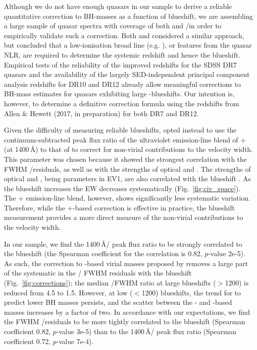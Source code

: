 Although we do not have enough quasars in our sample to derive a reliable quantitative correction to BH-masses as a function of  blueshift, we are assembling a large sample of quasar spectra with coverage of both  and \hbns/\ha in order to empirically validate such a correction. 
Both \citet{runnoe13} and \citet{shen12} considered a similar approach, but concluded that a low-ionisation broad line (e.g. ), or features from the quasar NLR, are required to determine the systemic redshift and hence the  blueshift. 
Empirical tests of the reliability of the improved \citet{hewett10} redshifts for the SDSS DR7 quasars \citep{shen16b} and the availability of the largely SED-independent principal component analysis redshifts for DR10 and DR12 \citep{paris14, paris17} already allow meaningful corrections to BH-mass estimates for quasars exhibiting large -blueshifts.
Our intention is, however, to determine a definitive correction formula using the redshifts from Allen \& Hewett (2017, in preparation) for both DR7 and DR12.

Given the difficulty of measuring reliable  blueshifts, \citet{runnoe13} opted instead to use the continuum-subtracted peak flux ratio of the ultraviolet emission-line blend of + (at 1400\,\AA) to that of  to correct for non-virial contributions to the  velocity width. 
This parameter was chosen because it showed the strongest correlation with the FWHM /\hb residuals, as well as with the strengths of optical  and . 
The strengths of optical  and , being parameters in EV1, are also correlated with the  blueshift \citep{sulentic07}. 
As the  blueshift increases the EW decreases systematically (Fig.~\ref{fig:civ_space}).
The + emission-line blend, however, shows significantly less systematic variation. 
Therefore, while the \citet{runnoe13} +-based correction is effective in practice, the  blueshift measurement provides a more direct measure of the non-virial contributions to the  velocity width.

In our sample, we find the 1400\,\AA/ peak flux ratio to be strongly correlated to the  blueshift (the Spearman coefficient for the correlation is 0.82, $p$-value 2{\sc e}-5).
As such, the correction to -based virial masses proposed by \citet[][their equation 3]{runnoe13} removes a large part of the systematic in the \hans/ FWHM residuals with the  blueshift (Fig.~\ref{fig:corrections}); the median /\ha FWHM ratio at large  blueshifts ($>$1200\kms) is reduced from 4.5 to 1.5.
However, at low ($<$1200\kms)  blueshifts, the trend for  to predict lower BH masses persists, and the scatter between the - and \hans-based masses increases by a factor of two.   
In accordance with our expectations, we find the FWHM /\ha residuals to be more tightly correlated to the  blueshift (Spearman coefficient 0.82, $p$-value 3{\sc e}-5) than to the 1400\,\AA/ peak flux ratio (Spearman coefficient 0.72, $p$-value 7{\sc e}-4). 

